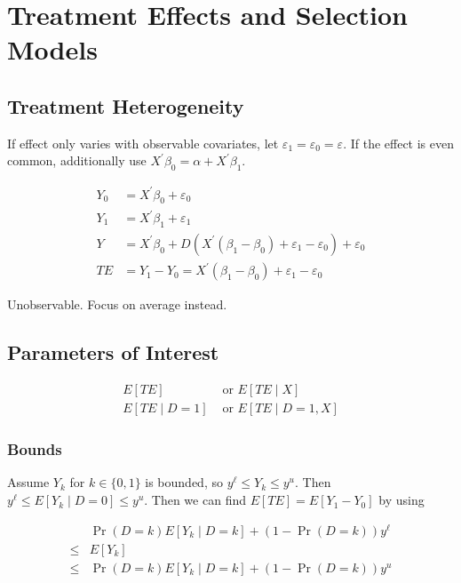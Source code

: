\section{Treatment Effects and Selection Models}

\subsection{Treatment Heterogeneity}

If effect only varies with observable covariates, let $\varepsilon_1 = \varepsilon_0 = \varepsilon$. If the effect is even common, additionally use $X^{\prime}\beta_0 = \alpha + X^{\prime}\beta_1$.

\begin{align*}
    Y_0 &= X^{\prime} \beta_0+\varepsilon_0 \\
    Y_1 &= X^{\prime} \beta_1+\varepsilon_1 \\
    Y &= X^{\prime} \beta_0+D\left(X^{\prime}\left(\beta_1-\beta_0\right)+\varepsilon_1-\varepsilon_0\right)+\varepsilon_0 \\
    TE &= Y_1-Y_0 = X^{\prime}\left(\beta_1-\beta_0\right)+\varepsilon_1-\varepsilon_0
\end{align*}

Unobservable. Focus on average instead.

\subsection{Parameters of Interest}

\begin{align*}
    \tag{ATE}
    E\left[TE\right] &\text { or } E\left[TE \mid X\right] \\
    \tag{ATET}
    E\left[TE \mid D=1\right] &\text { or } E\left[TE \mid D=1, X\right]
\end{align*}

\subsubsection{Bounds}

Assume $Y_k$ for $k\in\{0,1\}$ is bounded, so $y^{\ell} \leq Y_k \leq y^u$. Then $y^{\ell} \leq E\left[Y_k \mid D=0\right] \leq y^u$. Then we can find $E\left[TE\right] = E\left[Y_1 - Y_0\right]$ by using

\begin{align*}
    & \operatorname{Pr}(D=k) E\left[Y_k \mid D=k\right]+(1-\operatorname{Pr}(D=k)) y^{\ell} \\
    \leq & E\left[Y_k\right] \\
    \leq & \operatorname{Pr}(D=k) E\left[Y_k \mid D=k\right]+(1-\operatorname{Pr}(D=k)) y^u
\end{align*}


